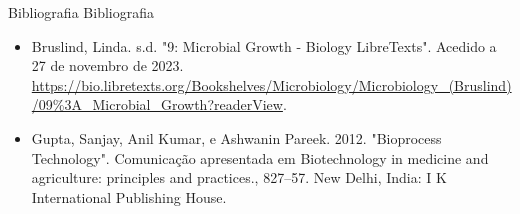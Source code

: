 \documentclass[\mainfilename]{subfiles}
\begin{document}

{Bibliografia} %
{Bibliografia} %

\begin{itemize}
    \item Bruslind, Linda. s.d. "9: Microbial Growth - Biology LibreTexts". Acedido a 27 de novembro de 2023. \url{https://bio.libretexts.org/Bookshelves/Microbiology/Microbiology_(Bruslind)/09%3A_Microbial_Growth?readerView}.
    \item Gupta, Sanjay, Anil Kumar, e Ashwanin Pareek. 2012. "Bioprocess Technology". Comunicação apresentada em Biotechnology in medicine and agriculture: principles and practices., 827--57. New Delhi, India: I K International Publishing House.
\end{itemize}
\end{document}
